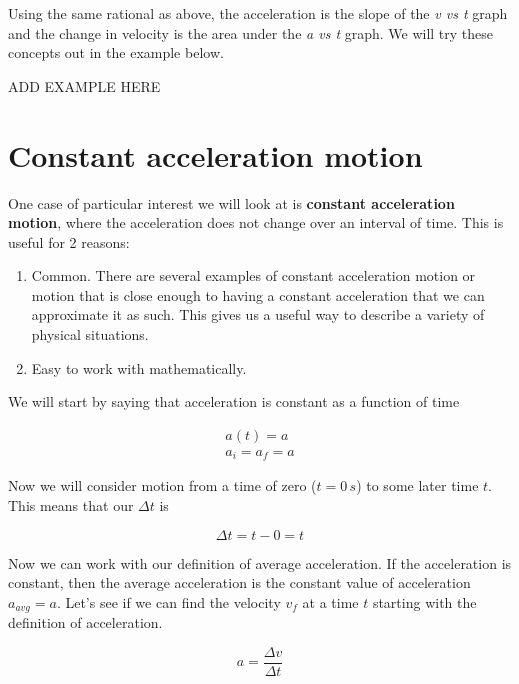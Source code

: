 \documentclass[12pt]{book}
\begin{document}
Using the same rational as above, the acceleration is the slope of the \textit{v vs t} graph and the change in velocity is the area under the \textit{a vs t} graph. We will try these concepts out in the example below.

ADD EXAMPLE HERE

\section{Constant acceleration motion}

One case of particular interest we will look at is \textbf{constant acceleration motion}, where the acceleration does not change over an interval of time. This is useful for 2 reasons:

\begin{enumerate}
\item Common. There are several examples of constant acceleration motion or motion that is close enough to having a constant acceleration that we can approximate it as such. This gives us a useful way to describe a variety of physical situations.

\item Easy to work with mathematically.
\end{enumerate}

We will start by saying that acceleration is constant as a function of time

\begin{equation}
\begin{split}
a(t) = a \\
a_i = a_f = a
\end{split}
\end{equation}

Now we will consider motion from a time of zero ($t = 0 \, s$) to some later time $t$. This means that our $\Delta t$ is

\begin{equation}
\Delta t = t - 0 = t
\end{equation}

Now we can work with our definition of average acceleration. If the acceleration is constant, then the average acceleration is the constant value of acceleration $a_{avg} = a$. Let's see if we can find the velocity $v_f$ at a time $t$ starting with the definition of acceleration.

\begin{equation}
a = \frac{\Delta v}{\Delta t}
\end{equation}
\end{document}
